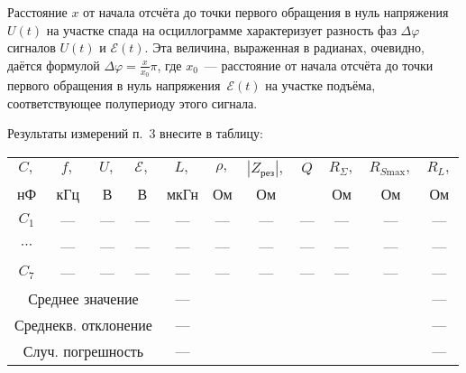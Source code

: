 \begin{lab:task}
    Расстояние $x$ от начала отсчёта до точки первого обращения в нуль
напряжения $U(t)$ на участке спада на осциллограмме характеризует разность фаз
$\Delta\varphi$ сигналов $U(t)$ и $\mathcal{E}(t).$ Эта величина, выраженная в
радианах, очевидно, даётся формулой $\Delta\varphi=\frac{x}{x_0}\pi$, где
$x_0$~--- расстояние от начала отсчёта до точки первого обращения в нуль
напряжения~$\mathcal{E}(t)$ на участке подъёма, соответствующее полупериоду
этого сигнала.


	\item Результаты измерений п.~3 внесите в таблицу:\par
\begingroup
\noindent\small \begin{tabular}{|c|c|c|c|c|c|c|c|c|c|c|}
	                \hline
	                $C,$ & $f,$ & $U,$ & $\mathcal{E},$ & $L,$ &
$\rho,$ & $|Z_{\text{рез}}|,$& $Q$ & $R_{\Sigma},$ & $R_{S
\text{max}},$& $R_L,$\\

	                нФ & кГц & В & В & мкГн & Ом & Ом &  & Ом & Ом & Ом \\
	                \hline
	                $C_1$ & --- & --- & --- & --- & --- & --- & --- & --- & --- & --- \\
	                \hline
	                $\cdots$ & --- & --- & --- & --- & --- & --- & --- & ---& --- & --- \\
	                \hline
	                $C_7$& --- & --- & --- & --- & --- & --- & ---& --- &--- &---\\
	                \hline
	                \multicolumn{4}{|c|}{Среднее значение} & --- & & & & & & --- \\
	                \hline
	                \multicolumn{4}{|c|}{Среднекв. отклонение} & ---& & & & & &--- \\
			                    \hline
	                \multicolumn{4}{|c|}{Случ. погрешность} & ---& & & & & &---\\
	                \hline
	            \end{tabular}\par
\endgroup


\end{lab:task}
